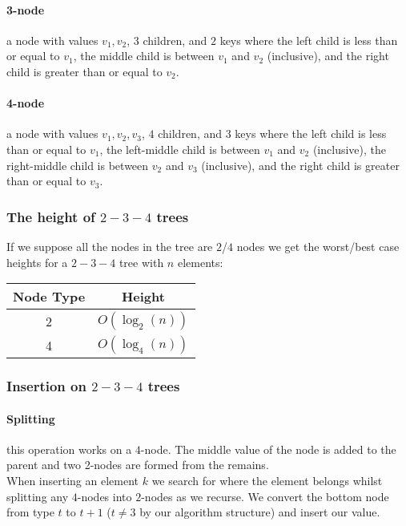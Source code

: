 \documentclass[a4paper, 12pt, twoside]{article}
\begin{document}
  \paragraph{3-node} a node with values $v_1, v_2$, $3$ children, and $2$ keys
  where the left child is less than or equal to $v_1$, 
  the middle child is between $v_1$ and $v_2$ (inclusive),
  and the right child is greater than or equal to $v_2$.
  \paragraph{4-node} a node with values $v_1, v_2, v_3$, $4$ children, and $3$ keys
  where the left child is less than or equal to $v_1$, 
  the left-middle child is between $v_1$ and $v_2$ (inclusive),
  the right-middle child is between $v_2$ and $v_3$ (inclusive),
  and the right child is greater than or equal to $v_3$.

\newpage

\subsubsection{The height of $2-3-4$ trees}

If we suppose all the nodes in the tree are $2$/$4$ nodes we get the
worst/best case heights for a $2-3-4$ tree with $n$ elements: \begin{center}
  \begin{tabular}{| c | c |}
    \hline
    Node Type & Height \\
    \hline 
    \hline 
    2 & $O(\log_2(n))$ \\
    \hline 
    4 & $O(\log_4(n))$ \\
    \hline
  \end{tabular}
\end{center}

\subsubsection{Insertion on $2-3-4$ trees}

\paragraph{Splitting} this operation works on a $4$-node. The middle value of the node
is added to the parent and two 2-nodes are formed from the remains.
\\[\baselineskip]
When inserting an element $k$ we search for where the element belongs whilst
splitting any $4$-nodes into $2$-nodes as we recurse. We convert the bottom node from
type $t$ to $t + 1$ ($t \neq 3$ by our algorithm structure) and insert our value.
\end{document}
